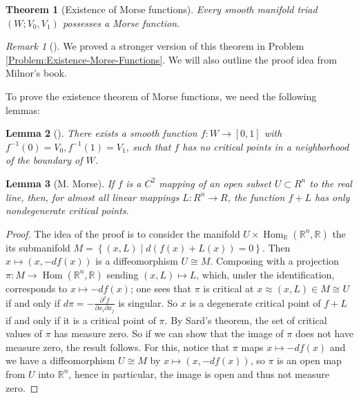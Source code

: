 \documentclass[reqno]{amsart}
\newtheorem{theorem}{Theorem}[section]
\newtheorem{lemma}[theorem]{Lemma}
\theoremstyle{definition}
\theoremstyle{remark}
\newtheorem*{remark}{Remark}
\DeclareMathOperator{\Hom}{Hom}
\begin{document}
   \begin{theorem}[Existence of
       Morse functions]\label{Existence-of-Morse-functions}
       Every smooth manifold triad
       $\left( W;V_0,V_1 \right) $ possesses
       a Morse function.
   \end{theorem}

   \begin{remark}[]
       We proved a stronger version of this theorem
       in Problem \ref{Problem:Existence-Morse-Functions}.
       We will also outline the proof idea from Milnor's book.
   \end{remark}

   To prove the existence theorem of Morse functions, 
   we need the following lemmas:

   \begin{lemma}[]
       There exists a smooth function
       $f \colon W \to \left[ 0,1 \right] $ with
       $f^{-1}(0) = V_0, f^{-1}(1) = V_1$, such that
       $f$ has no critical points in a neighborhood
       of the boundary of $W$.
   \end{lemma}

   \begin{lemma}[M. Morse]
       If $f$ is a $C^2$ mapping of an open subset
       $U \subset R^{n}$ to the real line, then,
       for almost all linear mappings
       $L \colon R^{n} \to R$, the function
       $f + L$ has only nondegenerate critical
       points.
   \end{lemma}

   \begin{proof}
       The idea of the proof is
       to consider the manifold
       $U \times \Hom_{\mathbb{R}} \left( \mathbb{R}^{n},
       \mathbb{R} \right) $ the its submanifold
       $M = 
       \left\{ \left( x,L \right)  \mid 
       d\left( f(x) + L(x) \right) = 0\right\} $.
       Then $x\mapsto \left( x,-df(x) \right) $ is
       a diffeomorphism $U \cong M$. Composing with
       a projection $\pi \colon M \to \Hom\left( \mathbb{R}^{n},
       \mathbb{R}\right) $ sending
       $\left( x,L \right) \mapsto L$, which,
       under the identification, corresponds to
       $x \mapsto -df(x)$; one sees that
       $\pi$ is critical at $x \approx \left( x,L \right) \in M
       \cong U$ 
       if and only if
       $d\pi = - \frac{\partial^2 f}{\partial x_i 
       \partial x_j}$ is singular.
       So $x$ is a degenerate critical point of $f + L$ 
       if and only if it is a critical point of
       $\pi$. By Sard's theorem, the set of critical
       values of $\pi$ has measure zero. So
       if we can show that the
       image of $\pi$ does not have measure zero, the result follows.
       For this, notice that
       $\pi$ maps $x \mapsto -df(x)$ and we have
       a diffeomorphism
       $U \cong M$ by
       $x \mapsto \left( x, -df(x) \right) $, so
       $\pi$ is an open map from
       $U$ into $\mathbb{R}^{n}$, hence
       in particular, the image is open and thus
       not measure zero.
   \end{proof}
\end{document}
